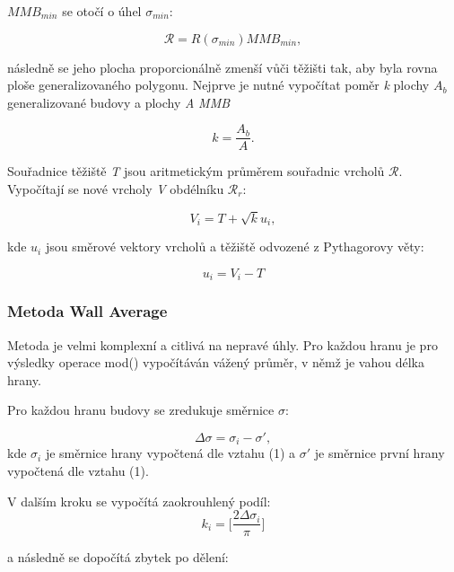 \documentclass[11pt]{article}
\begin{document}
	\textit{$MMB_{min}$} se otočí o úhel $ \sigma_{min} $:  
	
	\begin{equation}
	\mathcal{R} = R(\sigma_{min})MMB_{min}, 
	\end{equation}
	
	následně se jeho plocha proporcionálně zmenší vůči těžišti tak, aby byla rovna ploše generalizovaného polygonu. Nejprve je nutné vypočítat poměr \textit{k} plochy \textit{$A_b$} generalizované budovy a plochy \textit{A} \textit{MMB}
	
	\begin{equation}
		k = \dfrac{A_b}{A}.
	\end{equation}
	
	Souřadnice těžiště \textit{T} jsou aritmetickým průměrem souřadnic vrcholů $\mathcal{R}$. Vypočítají se nové vrcholy \textit{V} obdélníku $\mathcal{R}_r$:
	
	\begin{equation}
		V_i = T + \sqrt{k}u_i, 
	\end{equation}

	kde \textit{$u_i$} jsou směrové vektory vrcholů a těžiště odvozené z Pythagorovy věty:
	
	\begin{equation}
		u_i = V_i - T 
	\end{equation}



	\subsubsection{Metoda Wall Average}
	Metoda je velmi komplexní a citlivá na nepravé úhly. Pro každou hranu je pro výsledky operace mod() vypočítáván vážený průměr, v němž je vahou délka hrany.
	
	Pro každou hranu budovy se zredukuje směrnice $\sigma$:
		
	\begin{equation}
		\Delta\sigma = \sigma_i - \sigma',
	\end{equation} 
	kde $ \sigma_i $ je směrnice hrany vypočtená dle vztahu (1) a $ \sigma' $ je směrnice první hrany vypočtená dle vztahu (1). 
	
	V dalším kroku se vypočítá zaokrouhlený podíl:
	\begin{equation}
		k_i = \bigg[\frac{2\Delta\sigma_i}{\pi}\bigg]
	\end{equation}
	
	a následně se dopočítá zbytek po dělení:
	
\end{document}
